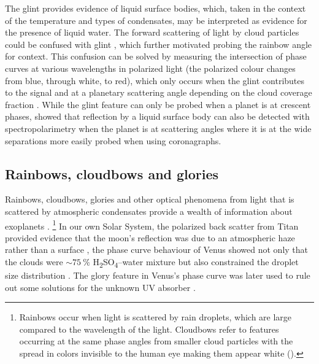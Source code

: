 \documentclass[
    usenatbib,
]{mnras}
\begin{document}
The glint provides evidence of liquid surface bodies, which, taken in the context of the temperature and types of condensates, may be interpreted as evidence for the presence of liquid water.
%
The forward scattering of light by cloud particles could be confused with glint \citep{Robinson_2010}, which further motivated probing the rainbow angle for context.
%
This confusion can be solved by measuring the intersection of phase curves at various wavelengths in polarized light (the polarized colour changes from blue, through white, to red), which only occurs when the glint contributes to the signal and at a planetary scattering angle depending on the cloud coverage fraction \citep{treesandstam2019}.
%
While the glint feature can only be probed when a planet is at crescent phases, \citet{trees2022} showed that reflection by a liquid surface body can also be detected with spectropolarimetry when the planet is at scattering angles where it is at the wide separations more easily probed when using coronagraphs.


\subsection{Rainbows, cloudbows and glories}

Rainbows, cloudbows, glories and other optical phenomena from light that is 
scattered by atmospheric condensates provide a wealth of information 
about exoplanets \citep{karalidi2012rainbow, stam2008,2014A&A...566L...1G}.%
\footnote{
    Rainbows occur when light is scattered by rain droplets, which are large compared to the wavelength of the light. Cloudbows refer to features occurring at the same phase angles from smaller cloud particles with the spread in colors invisible to the human eye making them appear white (\citet[see][for further discussion]{Bailey2007}).  
}
%
In our own Solar System, the polarized back scatter from Titan provided evidence that the moon's reflection was due to an atmospheric haze rather than a surface \citep{zellner1973polarization}, the phase curve behaviour of Venus showed not only that the clouds were $\sim\qty{75}{\percent}$ H\textsubscript{2}SO\textsubscript{4}--water mixture but also constrained the droplet size distribution \citep{hansenhovenier1974}. 
The glory feature in Venus's phase curve was later used to rule out some solutions for the unknown UV absorber \citep{petrova2018glory}.
\end{document}
